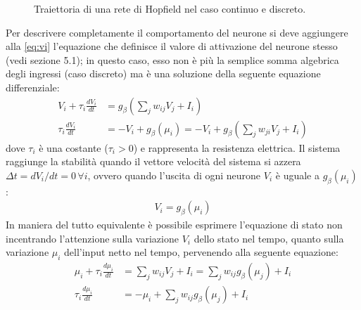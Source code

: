 \begin{figure}[h!]
	\centering
	\quad
	\caption{Traiettoria di una rete di Hopfield nel caso continuo e discreto.}
\end{figure}
Per descrivere completamente il comportamento del neurone si deve aggiungere alla \eqref{eq:vi} l'equazione che definisce il valore di attivazione del neurone stesso (vedi sezione 5.1); in questo caso, esso non è più la semplice somma algebrica degli ingressi (caso discreto) ma è una soluzione della seguente equazione differenziale:
\begin{align*}
	V_i + \tau_i \frac{d V_i}{dt} &= g_\beta \left(\sum_{j} w_{ij} V_j + I_i \right) \\
	\tau_i \frac{d V_i}{dt} &= - V_i + g_\beta(\mu_i) = - V_i + g_\beta \left(\sum_j w_{ji} V_j + I_i \right)
\end{align*}
dove $\tau_i$ è una costante ($\tau_i > 0$) e rappresenta la resistenza elettrica. Il sistema raggiunge la stabilità quando il vettore velocità del sistema si azzera $\Delta t = dV_i / dt= 0 \, \forall i$, ovvero quando l'uscita di ogni neurone $V_i$ è uguale a $g_\beta(\mu_i)$:
\begin{align*}
	V_i = g_\beta(\mu_i)
\end{align*}
In maniera del tutto equivalente è possibile esprimere l’equazione di stato non incentrando l’attenzione sulla variazione $V_i$ dello stato nel tempo, quanto sulla variazione $\mu_i$ dell’input netto nel tempo, pervenendo alla seguente equazione:
\begin{align}
	\mu_i + \tau_i \frac{d\mu_i}{dt} &= \sum_j w_{ij} V_j + I_i = \sum_j w_{ij} g_\beta (\mu_j) + I_i \\
	\tau_i \frac{d\mu_i}{dt} &= -\mu_i + \sum_j w_{ij} g_\beta (\mu_j) + I_i \label{eq:mu}
\end{align}

\newpage

